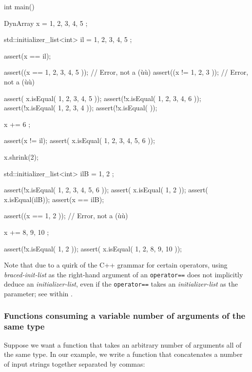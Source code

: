 \begin{emcppslisting}[emcppsbatch=e6]
int main()
{
    DynArray x = { 1, 2, 3, 4, 5 };

    std::initializer_list<int> il = { 1, 2, 3, 4, 5 };

    assert(x == il);

    assert((x == { 1, 2, 3, 4, 5 }));  // Error, not a (ù{}ù)
    assert((x != { 1, 2, 3 }));        // Error, not a (ù{}ù)

    assert( x.isEqual({ 1, 2, 3, 4, 5 }));
    assert(!x.isEqual({ 1, 2, 3, 4, 6 }));
    assert(!x.isEqual({ 1, 2, 3, 4 }));
    assert(!x.isEqual({ }));

    x += { 6 };

    assert(x != il);
    assert( x.isEqual({ 1, 2, 3, 4, 5, 6 }));

    x.shrink(2);

    std::initializer_list<int> ilB = { 1, 2 };

    assert(!x.isEqual({ 1, 2, 3, 4, 5, 6 }));
    assert( x.isEqual({ 1, 2 }));
    assert( x.isEqual(ilB));
    assert(x == ilB);

    assert((x == { 1, 2 }));  // Error, not a (ù{}ù)

    x += { 8, 9, 10 };

    assert(!x.isEqual({ 1, 2 }));
    assert( x.isEqual({ 1, 2, 8, 9, 10 }));
}
\end{emcppslisting}
    

\noindent Note that due to a quirk of the C++ grammar for certain operators, using
\emph{braced-init-list} as the right-hand argument of an
\lstinline!operator==! does not implicitly deduce an
\emph{initializer-list}, even if the \lstinline!operator==! takes an
\emph{initializer-list} as the parameter; see  within .

\subsubsection[Functions consuming a variable number of arguments of the same type]{Functions consuming a variable number of arguments of the same type}\label{functions-consuming-a-variable-number-of-arguments-of-the-same-type}

Suppose we want a function that takes an arbitrary number of arguments
all of the same type. In our example, we write a function that
concatenates a number of input strings together separated by commas:

